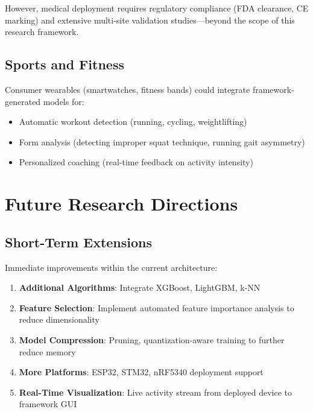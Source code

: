 However, medical deployment requires regulatory compliance (FDA clearance, CE marking) and extensive multi-site validation studies—beyond the scope of this research framework.

\subsection{Sports and Fitness}
Consumer wearables (smartwatches, fitness bands) could integrate framework-generated models for:
\begin{itemize}
    \item Automatic workout detection (running, cycling, weightlifting)
    \item Form analysis (detecting improper squat technique, running gait asymmetry)
    \item Personalized coaching (real-time feedback on activity intensity)
\end{itemize}

\section{Future Research Directions}

\subsection{Short-Term Extensions}
Immediate improvements within the current architecture:
\begin{enumerate}
    \item \textbf{Additional Algorithms}: Integrate XGBoost, LightGBM, k-NN
    \item \textbf{Feature Selection}: Implement automated feature importance analysis to reduce dimensionality
    \item \textbf{Model Compression}: Pruning, quantization-aware training to further reduce memory
    \item \textbf{More Platforms}: ESP32, STM32, nRF5340 deployment support
    \item \textbf{Real-Time Visualization}: Live activity stream from deployed device to framework GUI
\end{enumerate}

